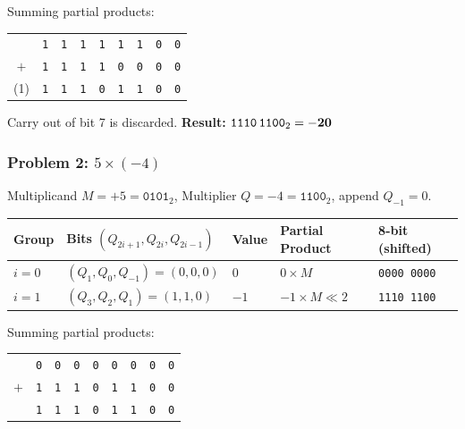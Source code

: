 \documentclass{article}
\begin{document}
\noindent Summing partial products:

\begin{center}
\renewcommand{\arraystretch}{1.2}
\begin{tabular}{ccccccccc}
  & \texttt{1} & \texttt{1} & \texttt{1} & \texttt{1} & \texttt{1} & \texttt{1} & \texttt{0} & \texttt{0} \\
$+$ & \texttt{1} & \texttt{1} & \texttt{1} & \texttt{1} & \texttt{0} & \texttt{0} & \texttt{0} & \texttt{0} \\
\hline
(1) & \texttt{1} & \texttt{1} & \texttt{1} & \texttt{0} & \texttt{1} & \texttt{1} & \texttt{0} & \texttt{0} \\
\end{tabular}
\end{center}

\noindent
Carry out of bit 7 is discarded.
\textbf{Result:} $\texttt{1110\,1100}_2 = \mathbf{-20}$ \checkmark

\subsubsection*{Problem 2: $5 \times (-4)$}

\noindent
Multiplicand $M = +5 = \texttt{0101}_2$, \quad Multiplier $Q = -4 = \texttt{1100}_2$,
append $Q_{-1} = 0$.

\begin{center}
\renewcommand{\arraystretch}{1.8}
\begin{tabular}{|>{\centering\arraybackslash}p{1.5cm}|>{\centering\arraybackslash}p{4.5cm}|>{\centering\arraybackslash}p{2cm}|>{\centering\arraybackslash}p{2cm}|>{\centering\arraybackslash}p{3cm}|}
\hline
\textbf{Group} & \textbf{Bits $(Q_{2i+1},Q_{2i},Q_{2i-1})$} & \textbf{Value} & \textbf{Partial Product} & \textbf{8-bit (shifted)} \\
\hline
$i=0$ & $(Q_1,Q_0,Q_{-1}) = (0,0,0)$ & $0$ & $0 \times M$ & \texttt{0000\,0000} \\
\hline
$i=1$ & $(Q_3,Q_2,Q_1) = (1,1,0)$ & $-1$ & $-1 \times M \ll 2$ & \texttt{1110\,1100} \\
\hline
\end{tabular}
\end{center}

\noindent Summing partial products:

\begin{center}
\renewcommand{\arraystretch}{1.2}
\begin{tabular}{ccccccccc}
  & \texttt{0} & \texttt{0} & \texttt{0} & \texttt{0} & \texttt{0} & \texttt{0} & \texttt{0} & \texttt{0} \\
$+$ & \texttt{1} & \texttt{1} & \texttt{1} & \texttt{0} & \texttt{1} & \texttt{1} & \texttt{0} & \texttt{0} \\
\hline
  & \texttt{1} & \texttt{1} & \texttt{1} & \texttt{0} & \texttt{1} & \texttt{1} & \texttt{0} & \texttt{0} \\
\end{tabular}
\end{center}
\end{document}
